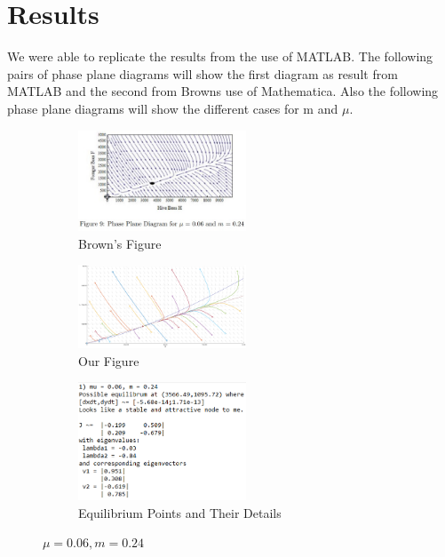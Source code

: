 \documentclass[a4paper,10pt]{article}
\begin{document}
\section{Results}
We were able to replicate the results from the use of MATLAB. The following pairs of phase plane diagrams will show the first diagram as result from MATLAB and the second from Browns use of Mathematica. Also the following phase plane diagrams will show the different cases for m and $\mu$.\\

\begin{figure}[H]
	\centering
	\begin{subfigure}[b]{0.4\textwidth}
		\centering
		\includegraphics[width=5cm]{Figure_9_1.jpg}
		\caption{Brown's Figure\cite{Brown}}
	\end{subfigure}
	\hfill
	\begin{subfigure}[b]{0.4\textwidth}
		\centering
		\includegraphics[width=5cm]{FIgure_1_M483_Phase.png}
		\caption{Our Figure}
	\end{subfigure}
	\begin{subfigure}[b]{0.4\textwidth}
		\centering
		\includegraphics[width = 5cm]{Project_App_Info_1.png}
		\caption{Equilibrium Points and Their Details}
	\end{subfigure}
	\caption{$\mu = 0.06, m = 0.24$}
\end{figure}
\end{document}
